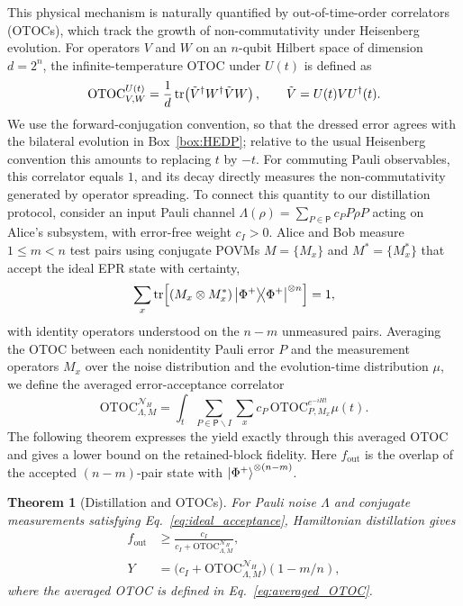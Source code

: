 \documentclass[onecolumn,prx,longbibliography,nofootinbib, superscriptaddress]{revtex4-2}
\newtheorem{theorem}{Theorem}
\theoremstyle{recap}
\begin{document}
This physical mechanism is naturally quantified by out-of-time-order correlators (OTOCs), which track the growth of non-commutativity under Heisenberg evolution. For operators $V$ and $W$ on an $n$-qubit Hilbert space of dimension $d=2^n$, the infinite-temperature OTOC under $U(t)$ is defined as
\begin{equation}
    \mathrm{OTOC}_{V,W}^{U(t)}=\frac{1}{d}\tr\!\left(\tilde{V}^{\dagger}W^{\dagger}\tilde{V}W\right),\qquad
    \tilde{V}=U(t)VU^{\dagger}(t).
\end{equation}
We use the forward-conjugation convention, so that the dressed error agrees with the bilateral evolution in Box~\ref{box:HEDP}; relative to the usual Heisenberg convention this amounts to replacing $t$ by $-t$. For commuting Pauli observables, this correlator equals $1$, and its decay directly measures the non-commutativity generated by operator spreading. To connect this quantity to our distillation protocol, consider an input Pauli channel $\Lambda(\rho)=\sum_{P\in\mathsf{P}}c_P P\rho P$ acting on Alice's subsystem, with error-free weight $c_I>0$. Alice and Bob measure $1\leq m<n$ test pairs using conjugate POVMs $M=\{M_x\}$ and $M^*=\{M_x^*\}$ that accept the ideal EPR state with certainty,
\begin{equation}\label{eq:ideal_acceptance}
    \sum_x\tr\!\left[(M_x\otimes M_x^*)\ketbra{\Phi^+}{\Phi^+}^{\otimes n}\right]=1,
\end{equation}
with identity operators understood on the $n-m$ unmeasured pairs. Averaging the OTOC between each nonidentity Pauli error $P$ and the measurement operators $M_x$ over the noise distribution and the evolution-time distribution $\mu$, we define the averaged error-acceptance correlator
\begin{equation}\label{eq:averaged_OTOC}
    \mathrm{OTOC}_{\Lambda,M}^{\mathcal{N}_H}
    =\int_t\sum_{P\in\mathsf{P}\backslash I}\sum_x
    c_P\,\mathrm{OTOC}_{P,M_x}^{e^{-iHt}}\mu(t).
\end{equation}
The following theorem expresses the yield exactly through this averaged OTOC and gives a lower bound on the retained-block fidelity. Here $f_{\mathrm{out}}$ is the overlap of the accepted $(n-m)$-pair state with $\ket{\Phi^+}^{\otimes(n-m)}$.

\begin{theorem}[Distillation and OTOCs]\label{thm:OTOC}
    For Pauli noise $\Lambda$ and conjugate measurements satisfying Eq.~\eqref{eq:ideal_acceptance}, Hamiltonian distillation gives
    \begin{equation}
    \begin{split}
        f_{\mathrm{out}}&\geq\frac{c_I}{c_I+\mathrm{OTOC}_{\Lambda,M}^{\mathcal{N}_H}},\\
        Y&=\bigl(c_I+\mathrm{OTOC}_{\Lambda,M}^{\mathcal{N}_H}\bigr)(1-m/n),
    \end{split}
    \end{equation}
    where the averaged OTOC is defined in Eq.~\eqref{eq:averaged_OTOC}.
\end{theorem}
\end{document}
